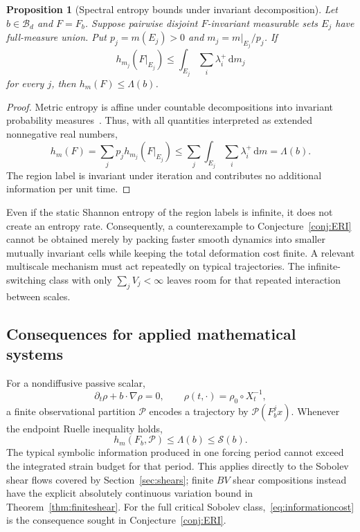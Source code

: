 \documentclass[review,12pt,times,a4paper,nopreprintline]{elsarticle}
\theoremstyle{plain}
\newtheorem{proposition}[theorem]{Proposition}
\theoremstyle{definition}
\theoremstyle{remark}
\newcommand{\B}{\mathscr B}
\newcommand{\PP}{\mathcal P}
\newcommand{\dd}{\,\mathrm d}
\newcommand{\action}{\mathcal S}
\numberwithin{equation}{section}
\begin{document}
\begin{proposition}[Spectral entropy bounds under invariant decomposition]\label{prop:cells}
Let $b\in\B_d$ and $F=F_b$. Suppose pairwise disjoint $F$-invariant measurable sets $E_j$ have full-measure union. Put $p_j=m(E_j)>0$ and $m_j=m|_{E_j}/p_j$. If
\[
 h_{m_j}(F|_{E_j})\leq\int_{E_j}\sum_i\lambda_i^+\dd m_j
\]
for every $j$, then $h_m(F)\leq\Lambda(b)$.
\end{proposition}
\begin{proof}
Metric entropy is affine under countable decompositions into invariant probability measures~\cite{Walters,KatokHasselblatt}. Thus, with all quantities interpreted as extended nonnegative real numbers,
\[
 h_m(F)=\sum_jp_jh_{m_j}(F|_{E_j})
 \leq\sum_j\int_{E_j}\sum_i\lambda_i^+\dd m
 =\Lambda(b).
\]
The region label is invariant under iteration and contributes no additional information per unit time.
\end{proof}

Even if the static Shannon entropy of the region labels is infinite, it does not create an entropy rate. Consequently, a counterexample to Conjecture~\ref{conj:ERI} cannot be obtained merely by packing faster smooth dynamics into smaller mutually invariant cells while keeping the total deformation cost finite. A relevant multiscale mechanism must act repeatedly on typical trajectories. The infinite-switching class with only $\sum_jV_j<\infty$ leaves room for that repeated interaction between scales.

\subsection{Consequences for applied mathematical systems}
For a nondiffusive passive scalar,
\[
 \partial_t\rho+b\cdot\nabla\rho=0,\qquad
 \rho(t,\cdot)=\rho_0\circ X_t^{-1},
\]
a finite observational partition $\PP$ encodes a trajectory by $\PP(F_b^jx)$. Whenever the endpoint Ruelle inequality holds,
\begin{equation}\label{eq:informationcost}
 h_m(F_b,\PP)\leq\Lambda(b)\leq\action(b).
\end{equation}
The typical symbolic information produced in one forcing period cannot exceed the integrated strain budget for that period. This applies directly to the Sobolev shear flows covered by Section~\ref{sec:shears}; finite $BV$ shear compositions instead have the explicit absolutely continuous variation bound in Theorem~\ref{thm:finiteshear}. For the full critical Sobolev class,~\eqref{eq:informationcost} is the consequence sought in Conjecture~\ref{conj:ERI}.
\end{document}
